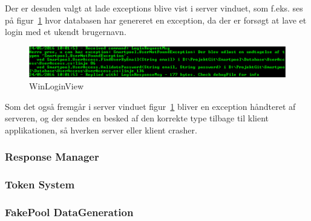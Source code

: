 Der er desuden valgt at lade exceptions blive vist i server vinduet, som f.eks. ses på figur~\ref{fig:asynchronousSocketListenerException} hvor databasen har genereret en exception, da der er forsøgt at lave et login med et ukendt brugernavn.

\begin{figure}
	\centering
	\includegraphics[width=0.7\linewidth]{figs/connection/asynchronousSocketListenerException.png}
	\caption{WinLoginView}
	\label{fig:asynchronousSocketListenerException}
\end{figure}

Som det også fremgår i server vinduet figur~\ref{fig:asynchronousSocketListenerException} bliver en exception håndteret af serveren, og der sendes en besked af den korrekte type tilbage til klient applikationen, så hverken server eller klient crasher.

\subsubsection{Response Manager}

\subsubsection{Token System}

\subsubsection{FakePool DataGeneration}


